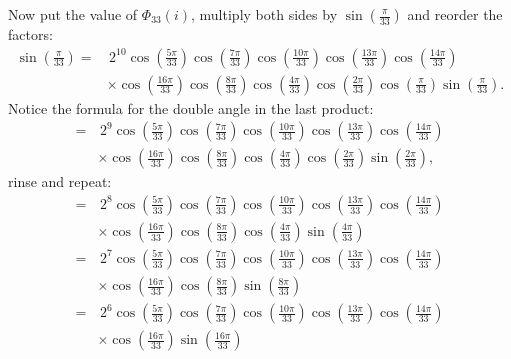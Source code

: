 \documentclass[12pt, a4paper]{article}
\begin{document}
Now put the value of $\Phi_{33}(i)$, multiply both sides by $\sin \left(\frac{\pi}{33}\right)$
and reorder the factors:
\begin{align*}
    \sin \left(\frac{\pi}{33}\right) =&\, 2^{10}
    \cos \left( {\frac{5\pi }{33}}\right)
    \cos \left( {\frac{7\pi }{33}}\right)
    \cos \left( {\frac{10\pi }{33}}\right)
    \cos \left( {\frac{13\pi }{33}}\right)
    \cos \left( {\frac{14\pi }{33}}\right)\\
    &\times
    \cos \left( {\frac{16\pi }{33}}\right)
    \cos \left( {\frac{8\pi }{33}}\right)
    \cos \left( {\frac{4\pi }{33}}\right)
    \cos \left( {\frac{2\pi}{33}}\right)
    \cos \left( {\frac{\pi }{33}}\right)
    \sin \left( {\frac{\pi }{33}}\right).
\end{align*}
Notice the formula for the double angle in the last product:
\begin{align*}
    = & \, 2^{9}
    \cos \left( {\frac{5\pi }{33}}\right)
    \cos \left( {\frac{7\pi }{33}}\right)
    \cos \left( {\frac{10\pi }{33}}\right)
    \cos \left( {\frac{13\pi }{33}}\right)
    \cos \left( {\frac{14\pi }{33}}\right)
    \\&\times
    \cos \left( {\frac{16\pi }{33}}\right)
    \cos \left( {\frac{8\pi }{33}}\right)
    \cos \left( {\frac{4\pi }{33}}\right)
    \cos \left( {\frac{2\pi}{33}}\right)
    \sin \left( {\frac{2\pi }{33}}\right),
\end{align*}
rinse and repeat:
\begin{align*}
    = &\, 2^{8}
    \cos \left( {\frac{5\pi }{33}}\right)
    \cos \left( {\frac{7\pi }{33}}\right)
    \cos \left( {\frac{10\pi }{33}}\right)
    \cos \left( {\frac{13\pi }{33}}\right)
    \cos \left( {\frac{14\pi }{33}}\right)
    \\&\times
    \cos \left( {\frac{16\pi }{33}}\right)
    \cos \left( {\frac{8\pi }{33}}\right)
    \cos \left( {\frac{4\pi }{33}}\right)
    \sin \left( {\frac{4\pi }{33}}\right)
\end{align*}
\begin{align*}
    = &\, 2^{7}
    \cos \left( {\frac{5\pi }{33}}\right)
    \cos \left( {\frac{7\pi }{33}}\right)
    \cos \left( {\frac{10\pi }{33}}\right)
    \cos \left( {\frac{13\pi }{33}}\right)
    \cos \left( {\frac{14\pi }{33}}\right)
    \\&\times
    \cos \left( {\frac{16\pi }{33}}\right)
    \cos \left( {\frac{8\pi }{33}}\right)
    \sin \left( {\frac{8\pi }{33}}\right)
\end{align*}
\begin{align*}
    = &\, 2^{6}
    \cos \left( {\frac{5\pi }{33}}\right)
    \cos \left( {\frac{7\pi }{33}}\right)
    \cos \left( {\frac{10\pi }{33}}\right)
    \cos \left( {\frac{13\pi }{33}}\right)
    \cos \left( {\frac{14\pi }{33}}\right)
    \\&\times
    \cos \left( {\frac{16\pi }{33}}\right)
    \sin \left( {\frac{16\pi }{33}}\right)
\end{align*}
\end{document}
